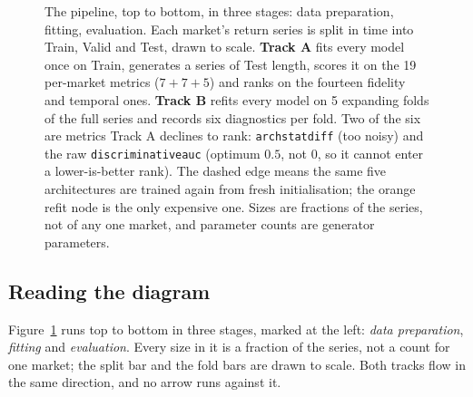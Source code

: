 \documentclass[11pt,a4paper]{article}
\makeatletter
\DeclareRobustCommand{\_}{\ifmmode\nfss@text{\textunderscore}\else\textunderscore\allowbreak\fi}
\makeatother
\begin{document}
\begin{figure}[p]
{}
\caption{The pipeline, top to bottom, in three stages: data preparation, fitting, evaluation. Each market's return series is split in time into Train, Valid and Test, drawn to scale. \textbf{Track A} fits every model once on Train, generates a series of Test length, scores it on the 19 per-market metrics ($7+7+5$) and ranks on the fourteen fidelity and temporal ones. \textbf{Track B} refits every model on 5 expanding folds of the full series and records six diagnostics per fold. Two of the six are metrics Track A declines to rank: \texttt{arch\_stat\_diff} (too noisy) and the raw \texttt{discriminative\_auc} (optimum $0.5$, not $0$, so it cannot enter a lower-is-better rank). The dashed edge means the same five architectures are trained again from fresh initialisation; the orange refit node is the only expensive one. Sizes are fractions of the series, not of any one market, and parameter counts are generator parameters.}
\label{fig:pipeline}
\end{figure}

\subsection{Reading the diagram}
\label{sec:pipeline-reading}
Figure~\ref{fig:pipeline} runs top to bottom in three stages, marked at the left: \emph{data preparation}, \emph{fitting} and \emph{evaluation}. Every size in it is a fraction of the series, not a count for one market; the split bar and the fold bars are drawn to scale. Both tracks flow in the same direction, and no arrow runs against it.
\end{document}
